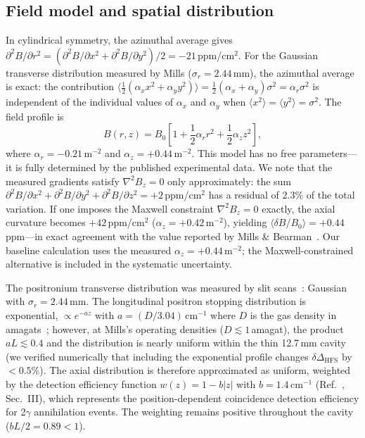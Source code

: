 \documentclass[twocolumn,pra,aps,superscriptaddress,floatfix,10pt]{revtex4-2}
\begin{document}
\subsection{Field model and spatial distribution}

In cylindrical symmetry, the azimuthal average gives $\partial^2 B/\partial r^2 = (\partial^2 B/\partial x^2 + \partial^2 B/\partial y^2)/2 = -21$\,ppm/cm$^2$. For the Gaussian transverse distribution measured by Mills ($\sigma_r = 2.44$\,mm), the azimuthal average is exact: the contribution $\langle\tfrac{1}{2}(\alpha_x x^2 + \alpha_y y^2)\rangle = \tfrac{1}{2}(\alpha_x + \alpha_y)\sigma^2 = \alpha_r \sigma^2$ is independent of the individual values of $\alpha_x$ and $\alpha_y$ when $\langle x^2\rangle = \langle y^2\rangle = \sigma^2$. The field profile is
\begin{equation}
  B(r,z) = B_0\left[1 + \frac{1}{2}\alpha_r r^2 + \frac{1}{2}\alpha_z z^2\right],
  \label{eq:mills_field}
\end{equation}
where $\alpha_r = -0.21$\,m$^{-2}$ and $\alpha_z = +0.44$\,m$^{-2}$. This model has no free parameters---it is fully determined by the published experimental data. We note that the measured gradients satisfy $\nabla^2 B_z = 0$ only approximately: the sum $\partial^2 B/\partial x^2 + \partial^2 B/\partial y^2 + \partial^2 B/\partial z^2 = +2$\,ppm/cm$^2$ has a residual of $2.3\%$ of the total variation. If one imposes the Maxwell constraint $\nabla^2 B_z = 0$ exactly, the axial curvature becomes $+42$\,ppm/cm$^2$ ($\alpha_z = +0.42$\,m$^{-2}$), yielding $\langle\delta B/B_0\rangle = +0.44$\,ppm---in exact agreement with the value reported by Mills \& Bearman~\cite{Mills1975}. Our baseline calculation uses the measured $\alpha_z = +0.44$\,m$^{-2}$; the Maxwell-constrained alternative is included in the systematic uncertainty.

The positronium transverse distribution was measured by slit scans~\cite{Mills1975}: Gaussian with $\sigma_r = 2.44$\,mm. The longitudinal positron stopping distribution is exponential, $\propto e^{-az}$ with $a = (D/3.04)$\,cm$^{-1}$ where $D$ is the gas density in amagats~\cite{Mills1975}; however, at Mills's operating densities ($D \lesssim 1$\,amagat), the product $aL \lesssim 0.4$ and the distribution is nearly uniform within the thin 12.7\,mm cavity (we verified numerically that including the exponential profile changes $\delta\Delta_\mathrm{HFS}$ by $< 0.5\%$). The axial distribution is therefore approximated as uniform, weighted by the detection efficiency function $w(z) = 1 - b|z|$ with $b = 1.4$\,cm$^{-1}$ (Ref.~\cite{Mills1975}, Sec.~III), which represents the position-dependent coincidence detection efficiency for 2$\gamma$ annihilation events. The weighting remains positive throughout the cavity ($b L/2 = 0.89 < 1$).
\end{document}
